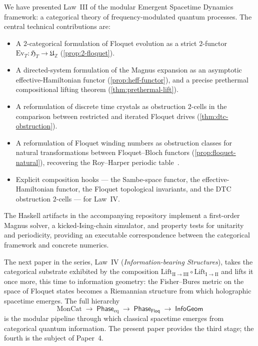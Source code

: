 \documentclass[12pt]{article}
\theoremstyle{definition}
\theoremstyle{remark}
\newcommand{\Z}{\mathbb{Z}}
\newcommand{\Floq}{\mathsf{Floq}}
\newcommand{\Phase}{\mathsf{Phase}}
\begin{document}
We have presented Law~III of the modular Emergent Spacetime Dynamics framework: a categorical theory of frequency-modulated quantum processes. The central technical contributions are:
\begin{itemize}
\item A $2$-categorical formulation of Floquet evolution as a strict $2$-functor $\mathrm{Ev}_T\colon\mathfrak{H}_T\to\mathfrak{U}_{\Z}$ (\cref{prop:2-floquet}).
\item A directed-system formulation of the Magnus expansion as an asymptotic effective-Hamiltonian functor (\cref{prop:heff-functor}), and a precise prethermal compositional lifting theorem (\cref{thm:prethermal-lift}).
\item A reformulation of discrete time crystals as obstruction $2$-cells in the comparison between restricted and iterated Floquet drives (\cref{thm:dtc-obstruction}).
\item A reformulation of Floquet winding numbers as obstruction classes for natural transformations between Floquet--Bloch functors (\cref{prop:floquet-natural}), recovering the Roy--Harper periodic table~\cite{roy2017}.
\item Explicit composition hooks --- the Sambe-space functor, the effective-Hamiltonian functor, the Floquet topological invariants, and the DTC obstruction $2$-cells --- for Law~IV.
\end{itemize}

The Haskell artifacts in the accompanying repository implement a first-order Magnus solver, a kicked-Ising-chain simulator, and property tests for unitarity and periodicity, providing an executable correspondence between the categorical framework and concrete numerics.

The next paper in the series, Law~IV (\emph{Information-bearing Structures}), takes the categorical substrate exhibited by the composition $\mathrm{Lift}_{\mathrm{II}\to\mathrm{III}}\circ\mathrm{Lift}_{\mathrm{I}\to\mathrm{II}}$ and lifts it once more, this time to information geometry: the Fisher--Bures metric on the space of Floquet states becomes a Riemannian structure from which holographic spacetime emerges. The full hierarchy
\begin{equation*}
\mathrm{MonCat}\;\longrightarrow\;\Phase_{\mathrm{eq}}\;\longrightarrow\;\Phase_{\Floq}\;\longrightarrow\;\mathsf{InfoGeom}
\end{equation*}
is the modular pipeline through which classical spacetime emerges from categorical quantum information. The present paper provides the third stage; the fourth is the subject of Paper~4.
\end{document}
